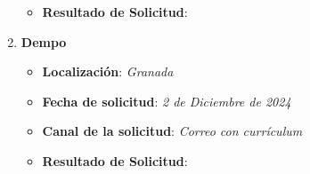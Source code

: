 \begin{enumerate}
\begin{itemize}
		\item \textbf{Resultado de Solicitud}: 
	\end{itemize}
	\item \textbf{Dempo}
	\begin{itemize}
		\item \textbf{Localización}: \textit{Granada}
		\item \textbf{Fecha de solicitud}: \textit{2 de Diciembre de 2024}
		\item \textbf{Canal de la solicitud}: \textit{Correo con currículum}
		\item \textbf{Resultado de Solicitud}: 
	\end{itemize}
\end{enumerate}







%

